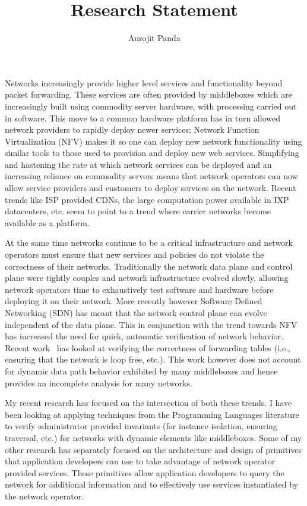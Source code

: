 \documentclass[letterpaper]{article}
\begin{document}
\title{\Large Research Statement}
\author{Aurojit Panda}
\date{}
\thispagestyle{empty}
\maketitle
Networks increasingly provide higher level services and functionality beyond packet forwarding. These services
are often provided by middleboxes which are increasingly built using commodity server hardware, with
processing carried out in software. This move to a common hardware platform has in turn allowed network
providers to rapidly deploy newer services; Network Function Virtualization (NFV) makes it so one can deploy
new network functionality using similar tools to those used to provision and deploy new web services.
Simplifying and hastening the rate at which network services can be deployed and an increasing reliance on
commodity servers means that network operators can now allow service providers and customers to deploy
services on the network. Recent trends like ISP provided CDNs, the large computation power available in IXP
datacenters, etc. seem to point to a trend where carrier networks become available as a platform.

At the same time networks continue to be a critical infrastructure and network operators must ensure that new
services and policies do not violate the correctness of their networks. Traditionally the network data plane
and control plane were tightly couples and network infrastructure evolved slowly, allowing network operators
time to exhaustively test software and hardware before deploying it on their network. More recently however
Software Defined Networking (SDN) has meant that the network control plane can evolve independent of the data
plane. This in conjunction with the trend towards NFV has increased the need for quick, automatic verification
of network behavior. Recent work~\cite{khurshid13veriflow, kazemian2012header} has looked at verifying the
correctness of forwarding tables (i.e., ensuring that the network is loop free, etc.). This work however does
not account for dynamic data path behavior exhibited by many middleboxes and hence provides an incomplete
analysis for many networks.

My recent research has focused on the intersection of both these trends. I have been looking at applying
techniques from the Programming Languages literature to verify administrator provided invariants (for instance
isolation, ensuring traversal, etc.) for networks with dynamic elements like middleboxes. Some of my other
research has separately focused on the architecture and design of primitives that application developers can
use to take advantage of network operator provided services. These primitives allow application developers to
query the network for additional information and to effectively use services instantiated by the network
operator.
\end{document}
